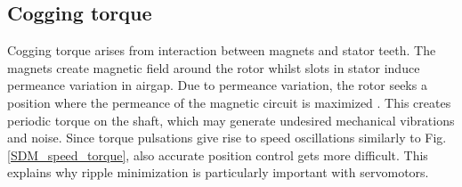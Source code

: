 \subsection{Cogging torque}


Cogging torque arises from interaction between magnets and stator teeth. The magnets create magnetic field around the rotor whilst slots in stator induce permeance variation in airgap. Due to permeance variation, the rotor seeks a position where the permeance of the magnetic circuit is maximized \cite{TRR:1999, CTR_HW:2013}. This creates periodic torque on the shaft, which may generate undesired mechanical vibrations and noise. Since torque pulsations give rise to speed oscillations similarly to Fig. \ref{SDM_speed_torque}, also accurate position control gets more difficult. This explains why ripple minimization is particularly important with servomotors. 




